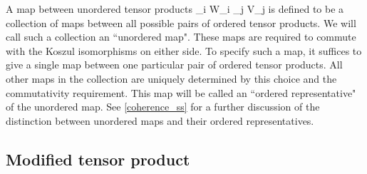 A map between unordered tensor products
\be
	\bigotimes_i W_i \; \to \; \bigotimes_j V_j
\ee
is defined to be a collection of maps between
all possible pairs of ordered tensor products.
We will call such a collection an ``unordered map".
These maps are required to commute with the Koszul isomorphisms on either side.
To specify such a map, it suffices to give a single map between one particular pair of ordered tensor products.
All other maps in the collection are uniquely determined by this choice and the commutativity requirement.
This map will be called an ``ordered representative" of the unordered map.
See \ref{coherence_ss} for a further discussion of the distinction between unordered maps and
their ordered representatives.





\subsection{Modified tensor product} \label{modified_tensor_product}



